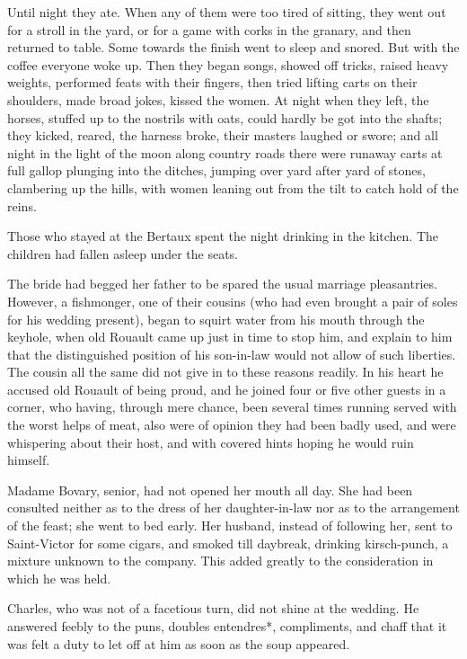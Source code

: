 \documentclass{tufte-book}
\begin{document}
Until night they ate. When any of them were too tired of sitting, they
went out for a stroll in the yard, or for a game with corks in the
granary, and then returned to table. Some towards the finish went to
sleep and snored. But with the coffee everyone woke up. Then they began
songs, showed off tricks, raised heavy weights, performed feats with
their fingers, then tried lifting carts on their shoulders, made broad
jokes, kissed the women. At night when they left, the horses, stuffed
up to the nostrils with oats, could hardly be got into the shafts; they
kicked, reared, the harness broke, their masters laughed or swore;
and all night in the light of the moon along country roads there were
runaway carts at full gallop plunging into the ditches, jumping over
yard after yard of stones, clambering up the hills, with women leaning
out from the tilt to catch hold of the reins.

Those who stayed at the Bertaux spent the night drinking in the kitchen.
The children had fallen asleep under the seats.

The bride had begged her father to be spared the usual marriage
pleasantries. However, a fishmonger, one of their cousins (who had even
brought a pair of soles for his wedding present), began to squirt water
from his mouth through the keyhole, when old Rouault came up just in
time to stop him, and explain to him that the distinguished position
of his son-in-law would not allow of such liberties. The cousin all the
same did not give in to these reasons readily. In his heart he accused
old Rouault of being proud, and he joined four or five other guests in
a corner, who having, through mere chance, been several times running
served with the worst helps of meat, also were of opinion they had been
badly used, and were whispering about their host, and with covered hints
hoping he would ruin himself.

Madame Bovary, senior, had not opened her mouth all day. She had been
consulted neither as to the dress of her daughter-in-law nor as to the
arrangement of the feast; she went to bed early. Her husband, instead
of following her, sent to Saint-Victor for some cigars, and smoked till
daybreak, drinking kirsch-punch, a mixture unknown to the company. This
added greatly to the consideration in which he was held.

Charles, who was not of a facetious turn, did not shine at the wedding.
He answered feebly to the puns, doubles entendres*, compliments, and
chaff that it was felt a duty to let off at him as soon as the soup
appeared.
\end{document}
